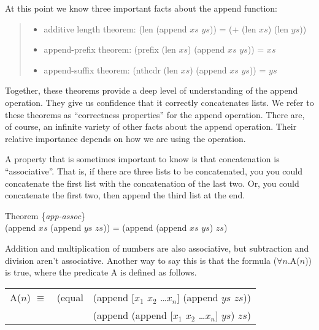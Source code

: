 At this point we know three important facts about the append function:
\begin{quote}
\begin{itemize}
\item additive length theorem: (len (append $xs$ $ys$)) = (+ (len $xs$) (len $ys$))
\label{app-pfx-thm}
\item append-prefix theorem: (prefix (len $xs$) (append $xs$ $ys$)) = $xs$
\item append-suffix theorem: (nthcdr (len $xs$) (append $xs$ $ys$)) = $ys$
\end{itemize}
\end{quote}

Together, these theorems provide a deep level of understanding of the append operation.
They give us confidence that it correctly concatenates lists.
We refer to these theorems as ``correctness properties'' for the append operation.
There are, of course, an infinite variety of other facts about the append operation.
Their relative importance depends on how we are using the operation.

A property that is sometimes important to know is that concatenation is ``associative''.
That is, if there are three lists to be concatenated,
you you could concatenate the first list with the concatenation of the last two.
Or, you could concatenate the first two, then append the third list at the end.

\begin{samepage}
\label{app-assoc}
\begin{center}
Theorem \{\emph{app-assoc}\} \\
(append $xs$ (append $ys$ $zs$)) = (append (append $xs$ $ys$) $zs$)
\end{center}
\end{samepage}

Addition and multiplication of numbers are also associative,
but subtraction and division aren't associative.
Another way to say this is that the formula
($\forall$$n$.A($n$)) is true, where the predicate A is defined as follows.

\begin{samepage}
\begin{center}
\begin{tabular} {lll}
A($n$) $\equiv$  & (equal & (append [$x_1$ $x_2$ \dots $x_n$] (append $ys$ $zs$)) \\
                 &        & (append (append [$x_1$ $x_2$ \dots $x_n$] $ys$) $zs$) \\
\end{tabular}
\end{center}
\end{samepage}

